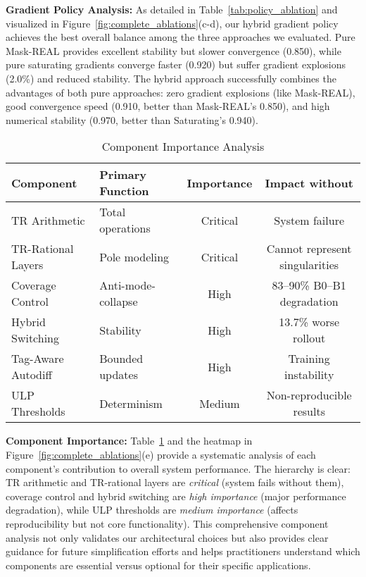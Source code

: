 \documentclass[twoside,11pt]{article}
\begin{document}
\textbf{Gradient Policy Analysis:} As detailed in Table~\ref{tab:policy_ablation} and visualized in Figure~\ref{fig:complete_ablations}(c-d), our hybrid gradient policy achieves the best overall balance among the three approaches we evaluated. Pure Mask-REAL provides excellent stability but slower convergence (0.850), while pure saturating gradients converge faster (0.920) but suffer gradient explosions (2.0\%) and reduced stability. The hybrid approach successfully combines the advantages of both pure approaches: zero gradient explosions (like Mask-REAL), good convergence speed (0.910, better than Mask-REAL's 0.850), and high numerical stability (0.970, better than Saturating's 0.940).

\begin{table}[t]
\centering
\caption{Component Importance Analysis}
\label{tab:component_importance}
\begin{tabular}{llcc}
\toprule
Component & Primary Function & Importance & Impact without \\
\midrule
TR Arithmetic & Total operations & Critical & System failure \\
TR-Rational Layers & Pole modeling & Critical & Cannot represent singularities \\
Coverage Control & Anti-mode-collapse & High & 83--90\% B0--B1 degradation \\
Hybrid Switching & Stability & High & 13.7\% worse rollout \\
Tag-Aware Autodiff & Bounded updates & High & Training instability \\
ULP Thresholds & Determinism & Medium & Non-reproducible results \\
\bottomrule
\end{tabular}
\end{table}

\textbf{Component Importance:} Table~\ref{tab:component_importance} and the heatmap in Figure~\ref{fig:complete_ablations}(e) provide a systematic analysis of each component's contribution to overall system performance. The hierarchy is clear: TR arithmetic and TR-rational layers are \emph{critical} (system fails without them), coverage control and hybrid switching are \emph{high importance} (major performance degradation), while ULP thresholds are \emph{medium importance} (affects reproducibility but not core functionality). This comprehensive component analysis not only validates our architectural choices but also provides clear guidance for future simplification efforts and helps practitioners understand which components are essential versus optional for their specific applications.
\end{document}
